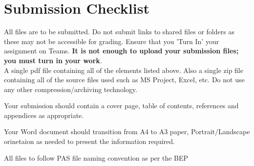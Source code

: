 \newpage
\section*{Submission Checklist}

All files are to be submitted.  Do not submit links to shared files or folders as these may not be accessible for grading.  Ensure that you 'Turn In' your assignment on Teams.  \textbf{It is not enough to upload your submission files; you must turn in your work}.\\

A single pdf file containing all of the elements listed above.  Also a single zip file containing all of the source files used such as MS Project, Excel, etc.
Do not use any other compression/archiving technology.

Your submission should contain a cover page, table of contents, references and appendices as appropriate.

Your Word document should transition from A4 to A3 paper, Portrait/Landscape orinetaion as needed to present the information required.

All files to follow PAS file naming convention as per the BEP


